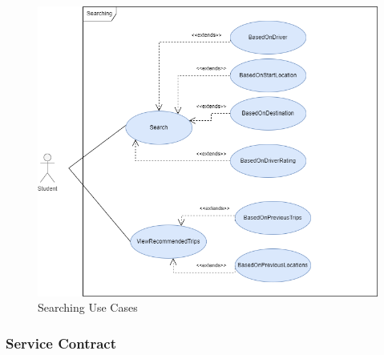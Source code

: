 \documentclass[hidelinks, 12pt, a4paper]{article}
\begin{document}
\begin{figure}[H]

      \centering
      \includegraphics[width = 15cm]{images/SearchingUseCase.drawio.png}
      \caption{Searching Use Cases}
      \label{fig:User UseCases}

\end{figure}
\newpage
\subsubsection{Service Contract}
\end{document}
